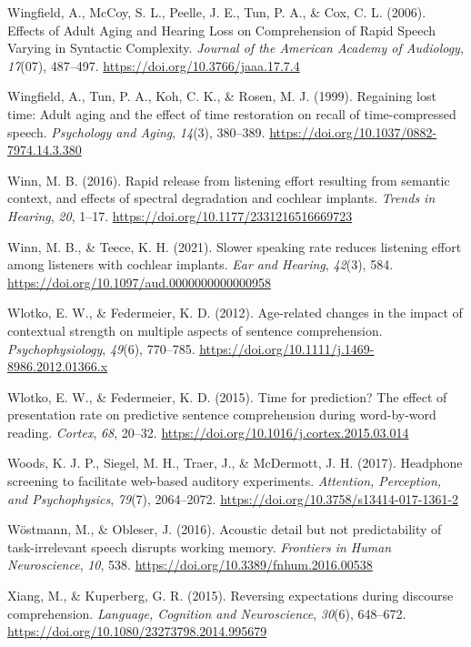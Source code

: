 \documentclass[a4paper, nobind]{templates/ociamthesis}
\newlength{\cslhangindent}
\newenvironment{CSLReferences}[2] %
 {%
  \setlength{\parindent}{0pt}
  \ifodd #1
  \let\oldpar\par
  \def\par{\hangindent=\cslhangindent\oldpar}
  \fi
  \setlength{\parskip}{1mm}
  \setlength{\baselineskip}{6mm}
 }%
 {}
\begin{document}
\begin{CSLReferences}{1}{0}
\leavevmode{}%
Wingfield, A., McCoy, S. L., Peelle, J. E., Tun, P. A., \& Cox, C. L. (2006). Effects of Adult Aging and Hearing Loss on Comprehension of Rapid Speech Varying in Syntactic Complexity. \emph{Journal of the American Academy of Audiology}, \emph{17}(07), 487--497. \url{https://doi.org/10.3766/jaaa.17.7.4}

\leavevmode{}%
Wingfield, A., Tun, P. A., Koh, C. K., \& Rosen, M. J. (1999). {Regaining lost time: Adult aging and the effect of time restoration on recall of time-compressed speech}. \emph{Psychology and Aging}, \emph{14}(3), 380--389. \url{https://doi.org/10.1037/0882-7974.14.3.380}

\leavevmode{}%
Winn, M. B. (2016). Rapid release from listening effort resulting from semantic context, and effects of spectral degradation and cochlear implants. \emph{Trends in Hearing}, \emph{20}, 1--17. \url{https://doi.org/10.1177/2331216516669723}

\leavevmode{}%
Winn, M. B., \& Teece, K. H. (2021). {Slower speaking rate reduces listening effort among listeners with cochlear implants}. \emph{Ear and Hearing}, \emph{42}(3), 584. \url{https://doi.org/10.1097/aud.0000000000000958}

\leavevmode{}%
Wlotko, E. W., \& Federmeier, K. D. (2012). Age-related changes in the impact of contextual strength on multiple aspects of sentence comprehension. \emph{Psychophysiology}, \emph{49}(6), 770--785. \url{https://doi.org/10.1111/j.1469-8986.2012.01366.x}

\leavevmode{}%
Wlotko, E. W., \& Federmeier, K. D. (2015). {Time for prediction? The effect of presentation rate on predictive sentence comprehension during word-by-word reading}. \emph{Cortex}, \emph{68}, 20--32. \url{https://doi.org/10.1016/j.cortex.2015.03.014}

\leavevmode{}%
Woods, K. J. P., Siegel, M. H., Traer, J., \& McDermott, J. H. (2017). {Headphone screening to facilitate web-based auditory experiments}. \emph{Attention, Perception, and Psychophysics}, \emph{79}(7), 2064--2072. \url{https://doi.org/10.3758/s13414-017-1361-2}

\leavevmode{}%
Wöstmann, M., \& Obleser, J. (2016). Acoustic detail but not predictability of task-irrelevant speech disrupts working memory. \emph{Frontiers in Human Neuroscience}, \emph{10}, 538. \url{https://doi.org/10.3389/fnhum.2016.00538}

\leavevmode{}%
Xiang, M., \& Kuperberg, G. R. (2015). {Reversing expectations during discourse comprehension}. \emph{Language, Cognition and Neuroscience}, \emph{30}(6), 648--672. \url{https://doi.org/10.1080/23273798.2014.995679}

\end{CSLReferences}

\end{document}
